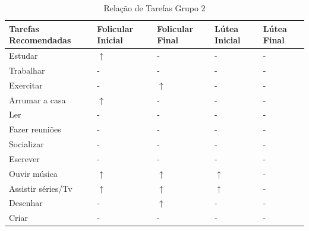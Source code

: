     \begin{table}[htbp]
        \centering
        \caption{Relação de Tarefas Grupo 2}
        \label{tab12}
        \begin{tabular}{p{5cm}p{1.8cm}p{1.8cm}p{1.8cm}p{1.8cm}}
            \toprule
            \textbf{Tarefas Recomendadas}  & \textbf{Folicular Inicial} & \textbf{Folicular Final}  & \textbf{Lútea Inicial}& \textbf{Lútea Final} \\ 
            \midrule
        Estudar & $\uparrow$  & -  & -  & -  \\ 
        \midrule
        Trabalhar & -  & -   & -  &  -   \\ 
        \midrule
        Exercitar & -  & $\uparrow$ & -  &  -  \\ 
        \midrule
        Arrumar a casa  & $\uparrow$ & -   & - & - \\ 
        \midrule
        Ler & - & -  & - & - \\ 
        \midrule
        Fazer reuniões & - & - & - & - \\ 
        \midrule
        Socializar & - & -  & - & - \\ 
        \midrule
        Escrever & - & -  & - & - \\ 
        \midrule
        Ouvir música & $\uparrow$ & $\uparrow$ & $\uparrow$ & - \\ 
        \midrule
        Assistir séries/Tv & $\uparrow$ & $\uparrow$ &$\uparrow$ & -\\ 
        \midrule
        Desenhar & - & $\uparrow$  & - & - \\ 
        \midrule
        Criar & - & -  & - & - \\ 
        \bottomrule    
        \end{tabular}
        \end{table}



